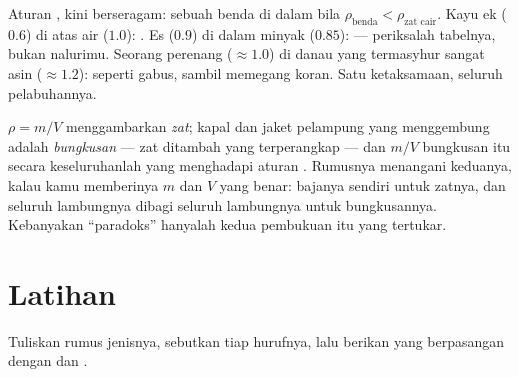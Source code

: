 \begin{example}\label{ex:g7:volume-mass-density:floating}
Aturan , kini berseragam: sebuah benda  di dalam
 bila $\rho_{\text{benda}} < \rho_{\text{zat cair}}$. Kayu ek
($0.6$) di atas air ($1.0$): . Es ($0.9$) di dalam minyak
($0.85$):  --- periksalah tabelnya, bukan nalurimu. Seorang
perenang ($\approx 1.0$) di danau yang termasyhur sangat asin
($\approx 1.2$):  seperti gabus, sambil memegang koran. Satu
ketaksamaan, seluruh pelabuhannya.
\end{example}

\begin{remark}\label{rem:g7:volume-mass-density:parcel}
$\rho = m/V$ menggambarkan \emph{zat}; kapal dan jaket pelampung yang
menggembung adalah \emph{bungkusan} --- zat ditambah  yang
terperangkap --- dan $m/V$ bungkusan itu secara keseluruhanlah yang
menghadapi aturan . Rumusnya menangani keduanya, kalau kamu
memberinya $m$ dan $V$ yang benar:  bajanya sendiri untuk
zatnya, dan  seluruh lambungnya dibagi  seluruh lambungnya
untuk bungkusannya. Kebanyakan ``paradoks''  hanyalah kedua
pembukuan itu yang tertukar.
\end{remark}

\section{Latihan}

\begin{exercise}[$\star$]\label{exo:g7:volume-mass-density:1}
Tuliskan rumus  jenisnya, sebutkan tiap hurufnya, lalu berikan
 yang berpasangan dengan  dan .
\end{exercise}

